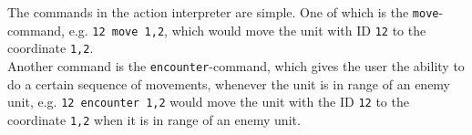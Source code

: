 The commands in the action interpreter are simple. One of which is the \texttt{move}-command, e.g. \texttt{12 move 1,2}, which would move the unit with ID \texttt{12} to the coordinate \texttt{1,2}.
\\
Another command is the \texttt{encounter}-command, which gives the user the ability to do a certain sequence of movements, whenever the unit is in range of an enemy unit, e.g. \texttt{12 encounter 1,2} would move the unit with the ID \texttt{12} to the coordinate \texttt{1,2} when it is in range of an enemy unit.


